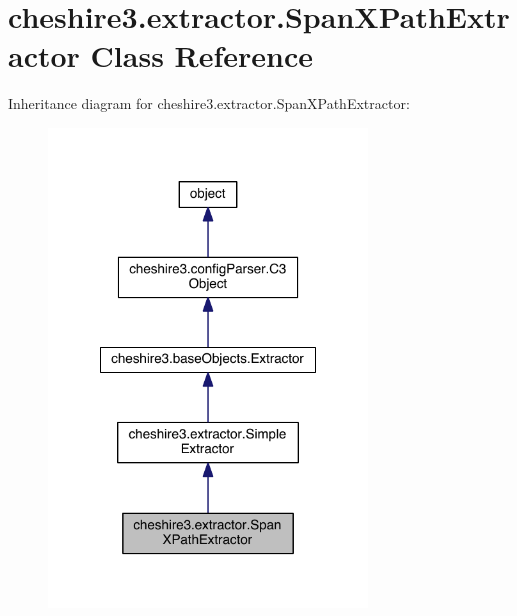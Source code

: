 \hypertarget{classcheshire3_1_1extractor_1_1_span_x_path_extractor}{\section{cheshire3.\-extractor.\-Span\-X\-Path\-Extractor Class Reference}
\label{classcheshire3_1_1extractor_1_1_span_x_path_extractor}
}


Inheritance diagram for cheshire3.\-extractor.\-Span\-X\-Path\-Extractor\-:
\nopagebreak
\begin{figure}[H]
\begin{center}
\leavevmode
\includegraphics[width=240pt]{classcheshire3_1_1extractor_1_1_span_x_path_extractor__inherit__graph}
\end{center}
\end{figure}



